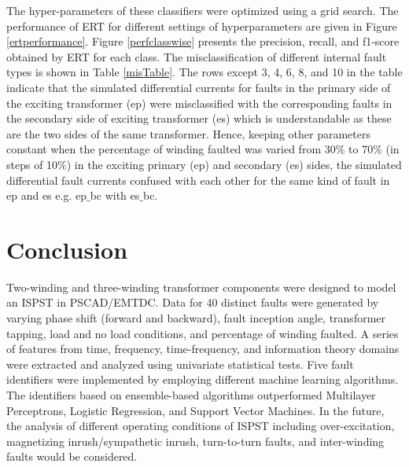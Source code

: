 \documentclass[conference]{IEEEtran}
\begin{document}
The hyper-parameters of these classifiers were optimized using a grid search. The performance of ERT for different settings of hyperparameters are given in Figure \ref{ertperformance}. Figure \ref{perfclasswise} presents the precision, recall, and f1-score obtained by ERT for each class. The misclassification of different internal fault types is shown in Table \ref{misTable}. The rows except 3, 4, 6, 8, and 10 in the table indicate that the simulated differential currents for faults in the primary side of the exciting transformer (ep) were misclassified with the corresponding faults in the secondary side of exciting transformer (es) which is understandable as these are the two sides of the same transformer. Hence, keeping other parameters constant when the percentage of winding faulted was varied from 30\% to 70\% (in steps of 10\%) in the exciting primary (ep) and secondary (es) sides, the simulated differential fault currents confused with each other for the same kind of fault in ep and es e.g. ep$\_$bc with es$\_$bc. 

\section{Conclusion}
Two-winding and three-winding transformer components were designed to model an ISPST in PSCAD/EMTDC. Data for 40 distinct faults were generated by varying phase shift (forward and backward), fault inception angle, transformer tapping, load and no load conditions, and percentage of winding faulted. A series of features from time, frequency, time-frequency, and information theory domains were extracted and analyzed using univariate statistical tests. Five fault identifiers were implemented by employing different machine learning algorithms. The identifiers based on ensemble-based algorithms outperformed Multilayer Perceptrons, Logistic Regression, and Support Vector Machines. In the future, the analysis of different operating conditions of ISPST including over-excitation, magnetizing inrush/sympathetic inrush, turn-to-turn faults, and inter-winding faults would be considered.
 
\small{

}
\end{document}
